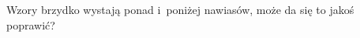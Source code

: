 \documentclass[a4paper,11pt]{article}
\begin{document}

\vspace{\spaceTwo}











\vspace{0em}




\noindent
{} Wzory brzydko wystają ponad i~poniżej nawiasów,
może da się to jakoś poprawić?

\vspace{\spaceFour}
\end{document}
